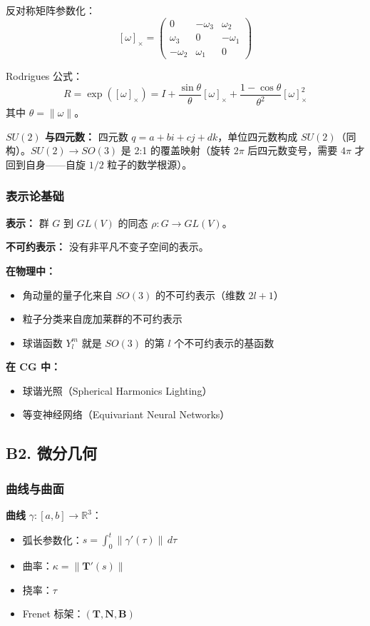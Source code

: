 反对称矩阵参数化：
\[
[\omega]_\times = \begin{pmatrix} 0 & -\omega_3 & \omega_2 \\ \omega_3 & 0 & -\omega_1 \\ -\omega_2 & \omega_1 & 0 \end{pmatrix}
\]

Rodrigues 公式：
\[
R = \exp([\omega]_\times) = I + \frac{\sin\theta}{\theta}[\omega]_\times + \frac{1-\cos\theta}{\theta^2}[\omega]_\times^2
\]
其中 $\theta = \|\omega\|$。

\textbf{$SU(2)$ 与四元数：} 四元数 $q = a + bi + cj + dk$，单位四元数构成 $SU(2)$（同构）。$SU(2) \to SO(3)$ 是 2:1 的覆盖映射（旋转 $2\pi$ 后四元数变号，需要 $4\pi$ 才回到自身——自旋 $1/2$ 粒子的数学根源）。

\subsubsection{表示论基础}

\textbf{表示：} 群 $G$ 到 $GL(V)$ 的同态 $\rho: G \to GL(V)$。

\textbf{不可约表示：} 没有非平凡不变子空间的表示。

\textbf{在物理中：}
\begin{itemize}
  \item 角动量的量子化来自 $SO(3)$ 的不可约表示（维数 $2l+1$）
  \item 粒子分类来自庞加莱群的不可约表示
  \item 球谐函数 $Y_l^m$ 就是 $SO(3)$ 的第 $l$ 个不可约表示的基函数
\end{itemize}

\textbf{在 CG 中：}
\begin{itemize}
  \item 球谐光照（Spherical Harmonics Lighting）
  \item 等变神经网络（Equivariant Neural Networks）
\end{itemize}

\subsection{B2. 微分几何}

\subsubsection{曲线与曲面}

\textbf{曲线} $\gamma: [a,b] \to \mathbb{R}^3$：
\begin{itemize}
  \item 弧长参数化：$s = \int_0^t \|\gamma'(\tau)\|\,d\tau$
  \item 曲率：$\kappa = \|\mathbf{T}'(s)\|$
  \item 挠率：$\tau$
  \item Frenet 标架：$(\mathbf{T}, \mathbf{N}, \mathbf{B})$
\end{itemize}

